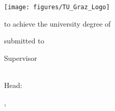 
\begin{titlepage}

{\sffamily

\begin{center}

\texttt{[image: figures/TU\_Graz\_Logo]}

\vfill\vfill\vfill
\vfill\vfill\vfill

\myauthorwithexistingtitles

\vfill\vfill\vfill

{\LARGE\bfseries\mytitle}


\vfill\vfill\vfill
\vfill\vfill\vfill


{\bfseries\large\myworktitle}

to achieve the university degree of

\mygrade

\mydegreeprogramme


\vfill\vfill\vfill


submitted to

\vfill

{\bfseries\large\myuniversity}


\vfill\vfill\vfill


Supervisor

\mysupervisor

\vfill

\myinstitute\\
Head: \myinstitutehead\\

\vfill



\vfill\vfill\vfill


\mysubmissiontown, \mysubmissionmonth~\mysubmissionyear

\end{center}
}%
\end{titlepage}

\newpage

